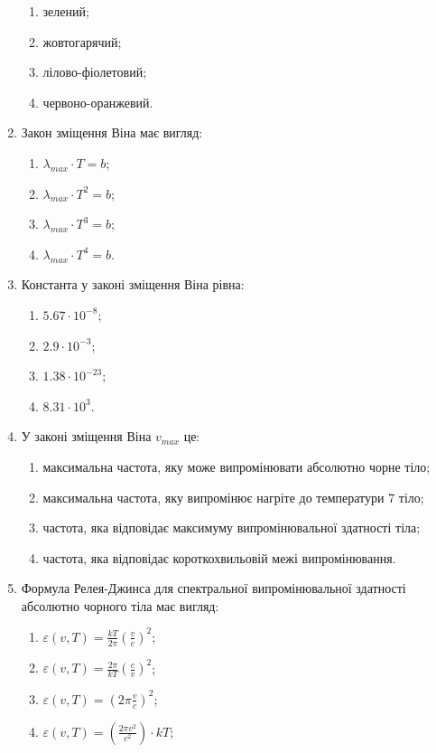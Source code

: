 \documentclass[twocolumn]{el-author}
\begin{document}
\begin{enumerate}
\begin{enumerate}
		\item зелений;
		\item жовтогарячий;
		\item лілово-фіолетовий;
		\item червоно-оранжевий.
	\end{enumerate}
	\item Закон зміщення Віна має вигляд:
	\begin{enumerate}
		\item $\lambda _{max} \cdot T = b$;
		\item $\lambda _{max} \cdot T^{2} = b$;
		\item $\lambda _{max} \cdot T^{3} = b$;
		\item $\lambda _{max} \cdot T^{4} = b$.
	\end{enumerate}
	\item Константа у законі зміщення Віна рівна:
	\begin{enumerate}
		\item $5.67 \cdot 10^{-8}$;
		\item $2.9 \cdot 10^{-3}$;
		\item $1.38 \cdot 10^{-23}$;
		\item $8.31 \cdot 10^{3}$.
	\end{enumerate}
	\item У законі зміщення Віна $v_{max}$ це:
	\begin{enumerate}
		\item максимальна частота, яку може випромінювати абсолютно чорне тіло;
		\item максимальна частота, яку випромінює нагріте до температури 7 тіло;
		\item частота, яка відповідає максимуму випромінювальної здатності тіла;
		\item частота, яка відповідає короткохвильовій межі випромінювання.
	\end{enumerate}
	\item Формула Релея-Джинса для спектральної випромінювальної здатності
		абсолютно чорного тіла має вигляд:
	\begin{enumerate}
		\item $\varepsilon (v,T) = \frac{kT}{2 \pi} (\frac{v}{c})^{2}$;
		\item $\varepsilon (v,T) = \frac{2 \pi}{kT} (\frac{c}{v})^{2}$;
		\item $\varepsilon (v,T) = (2 \pi \frac{v}{c})^{2}$;
		\item $\varepsilon (v,T) = (\frac{2 \pi v ^{2}}{c^{2}}) \cdot kT$;
	\end{enumerate}

\end{enumerate}
\end{document}
